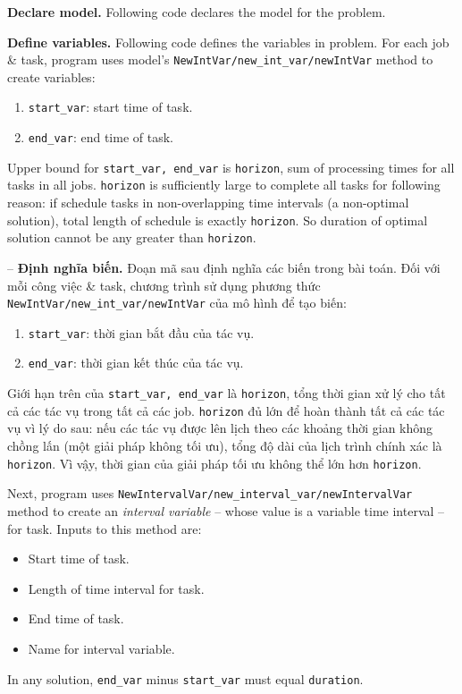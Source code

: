 \documentclass{article}
\begin{document}
{\bf Declare model.} Following code declares the model for the problem.

{\bf Define variables.} Following code defines the variables in problem. For each job \& task, program uses model's \verb|NewIntVar/new_int_var/newIntVar| method to create variables:
\begin{enumerate}
    \item \verb|start_var|: start time of task.
    \item \verb|end_var|: end time of task.
\end{enumerate}
Upper bound for \verb|start_var, end_var| is {\tt horizon}, sum of processing times for all tasks in all jobs. {\tt horizon} is sufficiently large to complete all tasks for following reason: if schedule tasks in non-overlapping time intervals (a non-optimal solution), total length of schedule is exactly {\tt horizon}. So duration of optimal solution cannot be any greater than {\tt horizon}.

-- {\bf Định nghĩa biến.} Đoạn mã sau định nghĩa các biến trong bài toán. Đối với mỗi công việc \& task, chương trình sử dụng phương thức \verb|NewIntVar/new_int_var/newIntVar| của mô hình để tạo biến:
\begin{enumerate}
    \item \verb|start_var|: thời gian bắt đầu của tác vụ.
    \item \verb|end_var|: thời gian kết thúc của tác vụ.
\end{enumerate}
Giới hạn trên của \verb|start_var, end_var| là {\tt horizon}, tổng thời gian xử lý cho tất cả các tác vụ trong tất cả các job. {\tt horizon} đủ lớn để hoàn thành tất cả các tác vụ vì lý do sau: nếu các tác vụ được lên lịch theo các khoảng thời gian không chồng lấn (một giải pháp không tối ưu), tổng độ dài của lịch trình chính xác là {\tt horizon}. Vì vậy, thời gian của giải pháp tối ưu không thể lớn hơn {\tt horizon}.

Next, program uses \verb|NewIntervalVar/new_interval_var/newIntervalVar| method to create an {\it interval variable} -- whose value is a variable time interval -- for task. Inputs to this method are:
\begin{itemize}
    \item Start time of task.
    \item Length of time interval for task.
    \item End time of task.
    \item Name for interval variable.
\end{itemize}
In any solution, \verb|end_var| minus \verb|start_var| must equal {\tt duration}.
\end{document}
